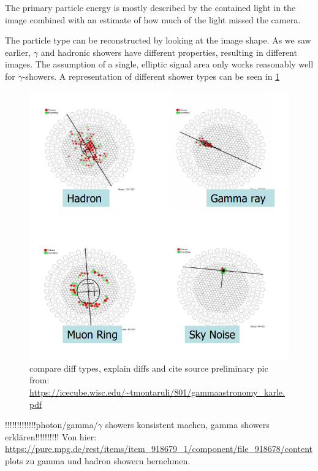 The primary particle energy is mostly described by the contained light in the image combined with 
an estimate of how much of the light missed the camera. 


The particle type can be reconstructed 
by looking at the image shape.
As we saw earlier, $\gamma$ and hadronic showers have different properties, 
resulting in different images. The assumption of a single, elliptic signal
area only works reasonably well for $\gamma$-showers.
A representation of different shower types can be seen in \ref{fig:compare_showers}

\begin{figure}
	\includegraphics[width=.8\textwidth]{images/shower_types.png}
	\caption{compare diff types, explain diffs  and cite source
	preliminary pic from: \url{https://icecube.wisc.edu/~tmontaruli/801/gammaastronomy_karle.pdf}}
	\label{fig:compare_showers}
\end{figure}




!!!!!!!!!!!!!photon/gamma/$\gamma$ showers konsistent machen, gamma showers erklären!!!!!!!!!!
Von hier:
\url{https://pure.mpg.de/rest/items/item_918679_1/component/file_918678/content}
plots zu gamma und hadron showern hernehmen.
